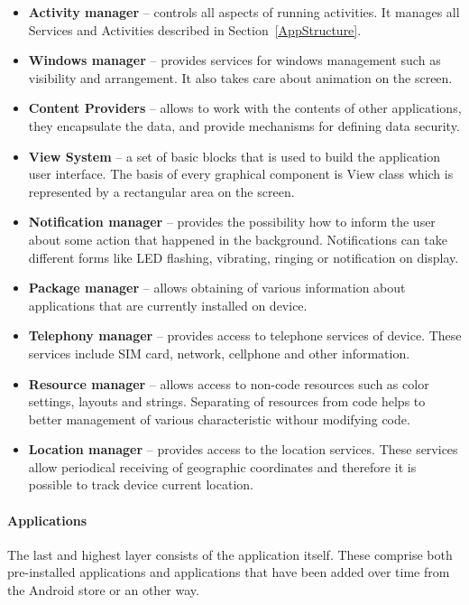\begin{itemize}
\item \textbf{Activity manager} -- controls all aspects of running activities. It manages all Services and Activities  described in Section~\ref{AppStructure}.
\item \textbf{Windows manager} -- provides services for windows management such as visibility and arrangement. It also takes care about animation on the screen.
\item \textbf{Content Providers} -- allows to work with the contents of other applications, they encapsulate the data, and provide mechanisms for defining data security.
\item \textbf{View System} -- a set of basic blocks that is used to build the application user interface. The basis of every graphical component is View class which is represented by a rectangular area on the screen.
\item \textbf{Notification manager} -- provides the possibility how to inform the user about some action that happened in the background. Notifications can take different forms like LED flashing, vibrating, ringing or notification on display.
\item \textbf{Package manager} -- allows obtaining of various information about applications that are currently installed on device.
\item \textbf{Telephony manager} -- provides access to telephone services of device. These services include SIM card, network, cellphone and other information.
\item \textbf{Resource manager} -- allows access to non-code resources such as color settings, layouts and strings. Separating of resources from code helps to better management of various characteristic withour modifying code.
\item \textbf{Location manager} -- provides access to the location services. These services allow periodical receiving of geographic coordinates and therefore it is possible to track device current location.
\end{itemize}

\paragraph{Applications}
The last and highest layer consists of the application itself. These comprise both pre-installed applications and applications that have been added over time from the Android store or an other way.

